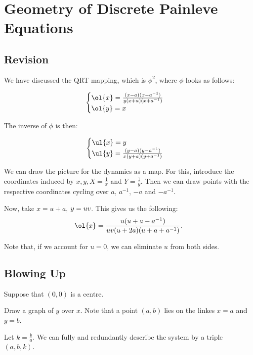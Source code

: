 \documentclass[11pt]{scrartcl}
\begin{document}
  \section{Geometry of Discrete Painleve Equations}

  \subsection{Revision}

  We have discussed the QRT mapping, which is $\phi^{2}$, where $\phi$ looks as follows:
  
  \begin{equation*}
    \begin{cases}
      \ol{x} = \frac{(x-a)(x-a^{-1})}{y(x+a)(x+a^{-1})}\\
      \ol{y} = x
    \end{cases}
  \end{equation*}

  The inverse of $\phi$ is then:

  \begin{equation*}
    \begin{cases}
      \ul{x} = y\\
      \ul{y} = \frac{(y-a)(y-a^{-1})}{x(y+a)(y+a^{-1})}
    \end{cases}
  \end{equation*}

  We can draw the picture for the dynamics as a map. For this,
  introduce the coordinates induced by $x, y, X=\frac{1}{x}$ and
  $Y = \frac{1}{y}$. Then we can draw points with the respective
  coordinates cycling over $a$, $a^{-1}$, $-a$ and $-a^{-1}$.

  Now, take $x = u + a$, $y = u\* v$. This gives us the following:
  \begin{align}
    \ol{x} = \frac{u(u+a-a^{-1})}{uv(u+2a)(u+a+a^{-1})}.
  \end{align}

  Note that, if we account for $u = 0$, we can eliminate $u$ from both
  sides.

  \subsection{Blowing Up}

  Suppose that $(0, 0)$ is a centre.

  Draw a graph of $y$ over $x$. Note that a point $(a, b)$ lies on the
  linkes $x=a$ and $y = b$.

  Let $k = \frac{b}{a}$. We can fully and redundantly describe the
  system by a triple $(a, b, k)$.
\end{document}
